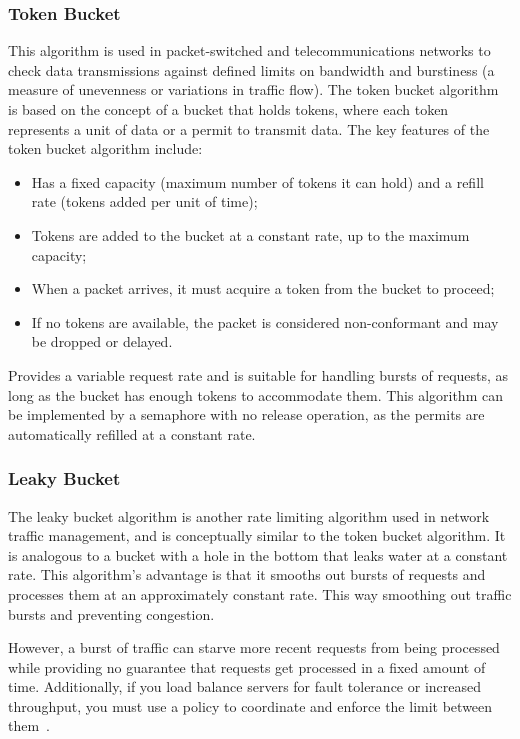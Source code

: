 \subsubsection{Token Bucket}\label{subsubsec:token-bucket-algorithm}

This algorithm is used in packet-switched and telecommunications networks
to check data transmissions against defined limits on bandwidth and burstiness
(a measure of unevenness or variations in traffic flow).
The token bucket algorithm is based on the concept of a bucket that holds tokens,
where each token represents a unit of data or a permit to transmit data.
The key features of the token bucket algorithm include:

\begin{itemize}
    \item Has a fixed capacity (maximum number of tokens it can hold) and a refill rate (tokens added per unit of time);
    \item Tokens are added to the bucket at a constant rate, up to the maximum capacity;
    \item When a packet arrives, it must acquire a token from the bucket to proceed;
    \item If no tokens are available, the packet is considered non-conformant and may be dropped or delayed.
\end{itemize}

Provides a variable request rate and is suitable for handling bursts of requests,
as long as the bucket has enough tokens to accommodate them.
This algorithm can be implemented by a semaphore with no release operation, as the permits are automatically refilled at a constant rate.

\subsubsection{Leaky Bucket}\label{subsubsec:leaky-bucket-algorithm}

The leaky bucket algorithm is another rate limiting algorithm used in network traffic management, and is conceptually similar to the token bucket algorithm.
It is analogous to a bucket with a hole in the bottom that leaks water at a constant rate.
This algorithm's advantage is that it smooths out bursts of requests and processes them at an approximately constant rate.
This way smoothing out traffic bursts and preventing congestion.

However,
a burst of traffic can starve more recent requests from being processed
while providing no guarantee that requests get processed in a fixed amount of time.
Additionally, if you load balance servers for fault tolerance or increased throughput,
you must use a policy to coordinate and enforce the limit between them~\cite{kong-rate-limiting}.

